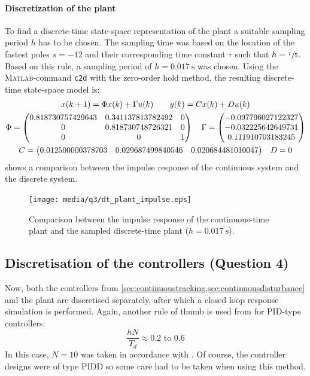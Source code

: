 \paragraph{Discretization of the plant}
To find a discrete-time state-space representation of the plant a suitable sampling period $h$ has to be chosen. The sampling time was based on the location of the fastest poles $s = -12$ and their corresponding time constant $\tau$ such that $h = \sfrac{\tau}{5}$. Based on this rule, a sampling period of $h = \SI{0.017}{\second}$ was chosen. Using the \textsc{Matlab}-command \texttt{c2d} with the zero-order hold method, the resulting discrete-time state-space model is:
\begin{equation}
    \begin{gathered}
        x(k+1) = \Phi x(k) + \Gamma u(k) \qquad y(k) = Cx(k) + Du(k)\\
        \Phi = 
        \begin{pmatrix}   
            0.818730757429643 &  0.341137813782492 &   0\\
            0 & 0.818730748726321 & 0\\
            0  &  0 &  1\\
        \end{pmatrix}\quad
        \Gamma = \begin{pmatrix}
            -0.097796027122327\\
            -0.032225642649731\\
             0.111910703183245\\
        \end{pmatrix}\\
        C = \mqty(0.012500000378703 & 0.029687499840546 & 0.020684481010047) \quad D = 0
    \end{gathered}
\end{equation}
 shows a comparison between the impulse response of the continuous system and the discrete system.
\begin{figure}
    \centering
    \texttt{[image: media/q3/dt\_plant\_impulse.eps]}
    \caption{Comparison between the impulse response of the continuous-time plant and the sampled discrete-time plant ($h = \SI{0.017}{\second}$).}
    \label{fig:q3_dt_plant_impulse}
\end{figure}

\subsection{Discretisation of the controllers \textnormal{\phantom{xxx}(Question 4)}}
\label{sec:discretisecontrollers}
Now, both the controllers from \cref{sec:continuoustracking,sec:continuousdisturbance} and the plant are discretised separately, after which a closed loop response simulation is performed. Again, another rule of thumb is used from \textcite[317]{astrom} for PID-type controllers:
\begin{equation}
    \frac{hN}{T_d} \approx 0.2 \text{ to } 0.6
    \label{eq:samplingpidrule}
\end{equation}
In this case, $N = 10$ was taken in accordance with \textcite{astrom}. Of course, the controller designs were of type PIDD so some care had to be taken when using this method.


